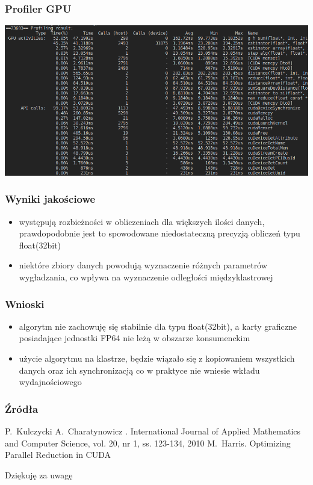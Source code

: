 \documentclass{beamer}
\begin{document}
\begin{frame}\frametitle{Profiler GPU}
\includegraphics[width=\textwidth]{nvprof250}
\end{frame}

\begin{frame}\frametitle{Wyniki jakościowe}
\begin{itemize}
\item występują rozbieżności w obliczeniach dla większych ilości danych, prawdopodobnie jest to spowodowane niedostateczną precyzją obliczeń typu float(32bit)
\item niektóre zbiory danych powodują wyznaczenie różnych parametrów wygładzania, co wpływa na wyznaczenie odległości międzyklastrowej
\end{itemize}
\end{frame}

\begin{frame}\frametitle{Wnioski}
\begin{itemize}
\item algorytm nie zachowuję się stabilnie dla typu float(32bit), a karty graficzne posiadające jednostki FP64 nie leżą w obszarze konsumenckim
\item użycie algorytmu na klastrze, będzie wiązało się z kopiowaniem wszystkich danych oraz ich synchronizacją co w praktyce nie wniesie wkładu wydajnościowego
\end{itemize}
\end{frame}


\begin{frame} \frametitle{Źródła}
\begin{thebibliography}{10}
\beamertemplatearticlebibitems
    P.~Kulczycki A.~Charatynowicz
    .
    \newblock International Journal of Applied Mathematics and Computer Science, vol. 20, nr 1, ss. 123-134, 2010
  \beamertemplatearticlebibitems
    M.~Harris.
    \newblock Optimizing Parallel Reduction in CUDA
\end{thebibliography}
\end{frame}

\begin{frame}
\begin{center}
\Huge Dziękuję za uwagę
\end{center}
\end{frame}
\end{document}
